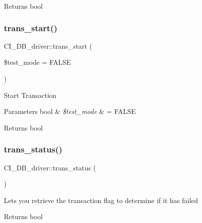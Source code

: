 \begin{DoxyReturn}{Returns}
bool 
\end{DoxyReturn}
\mbox{\label{class_c_i___d_b__driver_ac3a876e1eba59bb5e7f3dc0f7190fd8f}} 
\subsubsection{\texorpdfstring{trans\+\_\+start()}{trans\_start()}}
{\footnotesize\ttfamily C\+I\+\_\+\+D\+B\+\_\+driver\+::trans\+\_\+start (\begin{DoxyParamCaption}\item[{}]{\$test\+\_\+mode = {\ttfamily FALSE} }\end{DoxyParamCaption})}

Start Transaction


\begin{DoxyParams}[1]{Parameters}
bool & {\em \$test\+\_\+mode} & = F\+A\+L\+SE \\
\hline
\end{DoxyParams}
\begin{DoxyReturn}{Returns}
bool 
\end{DoxyReturn}
\mbox{\label{class_c_i___d_b__driver_a90e56d041469a720a1fa34fe8c24f900}} 
\subsubsection{\texorpdfstring{trans\+\_\+status()}{trans\_status()}}
{\footnotesize\ttfamily C\+I\+\_\+\+D\+B\+\_\+driver\+::trans\+\_\+status (\begin{DoxyParamCaption}{ }\end{DoxyParamCaption})}

Lets you retrieve the transaction flag to determine if it has failed

\begin{DoxyReturn}{Returns}
bool 
\end{DoxyReturn}
\mbox{\label{class_c_i___d_b__driver_ad1b732841acb3fc91888b7f7a39adb5f}} 
